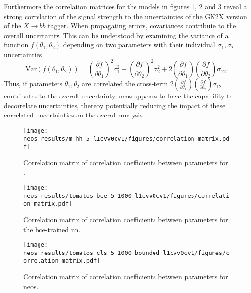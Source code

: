 Furthermore the correlation matrices for the models in figures \ref{fig:correlation_matrix_m_hh}, \ref{fig:correlation_matrix_bce} and \ref{fig:correlation_matrix_cls} reveal a strong correlation of the signal strength to the uncertainties of the GN2X version of the $X\rightarrow bb$ tagger. When propagating errors, covariances contribute to the overall uncertainty. This can be understood by examining the variance of a function $f(\theta_1, \theta_2)$ depending on two parameters with their individual $\sigma_1,\sigma_2$ uncertainties
\begin{equation}
    \text{Var}(f(\theta_1, \theta_2)) = \left( \frac{\partial f}{\partial \theta_1} \right)^2 \sigma_1^2 + \left( \frac{\partial f}{\partial \theta_2} \right)^2 \sigma_2^2 + 2 \left( \frac{\partial f}{\partial \theta_1} \right) \left( \frac{\partial f}{\partial \theta_2} \right) \sigma_{12}.
\end{equation}
Thus, if parameters $\theta_1, \theta_2$ are correlated the cross-term \(2 \left( \frac{\partial f}{\partial \theta_1} \right) \left( \frac{\partial f}{\partial \theta_2} \right) \sigma_{12}\) contributes to the overall uncertainty. \ac{neos} appears to have the capability to decorrelate uncertainties, thereby potentially reducing the impact of these correlated uncertainties on the overall analysis. 

\begin{figure}
    \centering
    \texttt{[image: neos\_results/m\_hh\_5\_l1cvv0cv1/figures/correlation\_matrix.pdf]}
    \caption[]{Correlation matrix of correlation coefficients between parameters for \mhh.}
    \label{fig:correlation_matrix_m_hh}
\end{figure}
\begin{figure}
    \centering
    \texttt{[image: neos\_results/tomatos\_bce\_5\_1000\_l1cvv0cv1/figures/correlation\_matrix.pdf]}
    \caption[]{Correlation matrix of correlation coefficients between parameters for the \ac{bce}-trained \ac{nn}.}
    \label{fig:correlation_matrix_bce}
\end{figure}
\begin{figure}
    \centering
    \texttt{[image: neos\_results/tomatos\_cls\_5\_1000\_bounded\_l1cvv0cv1/figures/correlation\_matrix.pdf]}
    \caption[]{Correlation matrix of correlation coefficients between parameters for \ac{neos}.}
    \label{fig:correlation_matrix_cls}
\end{figure}

